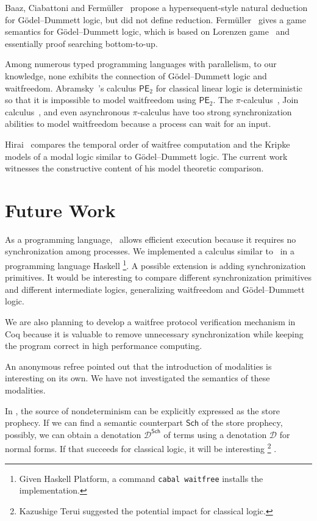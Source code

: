 Baaz, Ciabattoni and Ferm\"uller~\cite{natural} propose a 
hypersequent-style natural deduction for G\"odel--Dummett logic, but
did not define reduction.
Ferm\"uller~\cite{parallel} gives a game semantics for G\"odel--Dummett
logic, which is based on Lorenzen game~\cite{curryhoward} and essentially
proof searching bottom-to-up.

Among numerous typed programming languages with parallelism,
to our knowledge, none exhibits
the connection of G\"odel--Dummett logic and waitfreedom.
Abramsky~\cite{abramsky1993computational}'s calculus $\mathsf{PE}_2$
for classical linear logic is
deterministic
\cite[Theorem~7.9]{abramsky1993computational} so that it is
impossible to model
waitfreedom using $\mathsf{PE}_2$.
The $\pi$-calculus~\cite{milner1999communicating}, 
Join calculus~\cite{join},
and even asynchronous
$\pi$-calculus \cite{hondatokoro}
have too strong synchronization abilities to model waitfreedom because
a process can wait for an input.

Hirai~\cite{hirailpar} compares the temporal order of waitfree
computation and the Kripke models of a modal logic similar to
G\"odel--Dummett logic.  The current
work witnesses the constructive content of
his model theoretic comparison.

\section{Future Work}
\label{future}

As a programming language, \lgd\, allows efficient execution because it
requires no synchronization among processes.
We implemented a calculus similar to \lgd\, in a programming language
Haskell%
\footnote{Given Haskell Platform, a command \texttt{cabal
waitfree} installs the implementation.}.
A possible extension is adding synchronization primitives.
It would be interesting to compare different synchronization primitives
and different intermediate logics, generalizing waitfreedom and
G\"odel--Dummett logic.

We are also planning to develop a waitfree protocol verification mechanism in Coq
because it is valuable to
remove unnecessary synchronization while keeping the program correct
in high performance computing.

An anonymous refree pointed out that the introduction of
modalities is interesting on its own.
We have not investigated the semantics of these modalities.

In \lgd, the source of nondeterminism can be explicitly expressed as the
store prophecy.
If we can find a semantic counterpart $\mathsf{Sch}$ of the store
prophecy, possibly, we
can obtain a denotation $\mathcal{D}^\mathsf{Sch}$ of terms
using a denotation $\mathcal{D}$ for normal forms.
If that succeeds for classical logic, it will be interesting%
\footnote{Kazushige Terui suggested the potential impact for classical logic.}%
.

